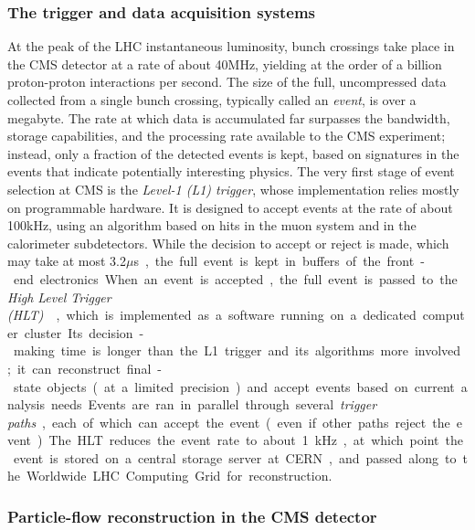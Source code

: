 \subsubsection{The trigger and data acquisition systems}

At the peak of the LHC instantaneous luminosity, bunch crossings take place in the CMS detector at a rate of about 40\unit{MHz}, yielding at the order of a billion proton-proton interactions per second.
% 
The size of the full, uncompressed data collected from a single bunch crossing, typically called an \textit{event}, is over a megabyte.
% 
The rate at which data is accumulated far surpasses the bandwidth, storage capabilities, and the processing rate available to the CMS experiment; instead, only a fraction of the detected events is kept, based on signatures in the events that indicate potentially interesting physics.
% 
The very first stage of event selection at CMS is the \textit{Level-1 (L1) trigger}, whose implementation relies mostly on programmable hardware.
% 
It is designed to accept events at the rate of about 100\unit{kHz}, using an algorithm based on hits in the muon system and in the calorimeter subdetectors.
% 
While the decision to accept or reject is made, which may take at most 3.2\unit{$\mu$s}, the full event is kept in buffers of the front-end electronics.


When an event is accepted, the full event is passed to the \textit{High Level Trigger (HLT)}~\cite{Adam:2005zf}, which is implemented as a software running on a dedicated computer cluster.
% 
Its decision-making time is longer than the L1 trigger and its algorithms more involved; it can reconstruct final-state objects (at a limited precision) and accept events based on current analysis needs.
% 
Events are ran in parallel through several \textit{trigger paths}, each of which can accept the event (even if other paths reject the event).
% 
The HLT reduces the event rate to about 1\unit{kHz}, at which point the event is stored on a central storage server at CERN, and passed along to the Worldwide LHC Computing Grid for reconstruction.



\subsubsection{Particle-flow reconstruction in the CMS detector}


